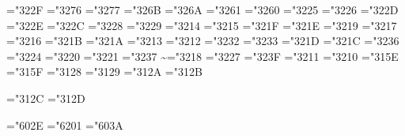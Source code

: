 \mathchardef\propto="322F
\mathchardef\sqsubseteq="3276
\mathchardef\sqsupseteq="3277
\mathchardef\parallel="326B
\mathchardef\mid="326A
\mathchardef\dashv="3261
\mathchardef\vdash="3260
\mathchardef\nearrow="3225
\mathchardef\searrow="3226
\mathchardef\nwarrow="322D
\mathchardef\swarrow="322E
\mathchardef\Leftrightarrow="322C
\mathchardef\Leftarrow="3228
\mathchardef\Rightarrow="3229
\def\neq{\not=} \let\ne=\neq
\mathchardef\leq="3214 \let\le=\leq
\mathchardef\geq="3215 \let\ge=\geq
\mathchardef\succ="321F
\mathchardef\prec="321E
\mathchardef\approx="3219
\mathchardef\succeq="3217
\mathchardef\preceq="3216
\mathchardef\supset="321B
\mathchardef\subset="321A
\mathchardef\supseteq="3213
\mathchardef\subseteq="3212
\mathchardef\in="3232
\mathchardef\ni="3233 \let\owns=\ni
\mathchardef\gg="321D
\mathchardef\ll="321C
\mathchardef\not="3236
\mathchardef\leftrightarrow="3224
\mathchardef\leftarrow="3220 \let\gets=\leftarrow
\mathchardef\rightarrow="3221 \let\to=\rightarrow
\mathchardef\mapstochar="3237 \def\mapsto{\mapstochar\rightarrow}
\mathchardef\sim="3218
\mathchardef\simeq="3227
\mathchardef\perp="323F
\mathchardef\equiv="3211
\mathchardef\asymp="3210
\mathchardef\smile="315E
\mathchardef\frown="315F
\mathchardef\leftharpoonup="3128
\mathchardef\leftharpoondown="3129
\mathchardef\rightharpoonup="312A
\mathchardef\rightharpoondown="312B

\def\joinrel{\mathrel{\mkern-3mu}}
\def\relbar{\mathrel{\smash-}} %
\def\Relbar{\mathrel=}
\mathchardef\lhook="312C \def\hookrightarrow{\lhook\joinrel\rightarrow}
\mathchardef\rhook="312D \def\hookleftarrow{\leftarrow\joinrel\rhook}
\def\bowtie{\mathrel\triangleright\joinrel\mathrel\triangleleft}
\def\models{\mathrel|\joinrel=}
\def\Longrightarrow{\Relbar\joinrel\Rightarrow}

\def\longrightarrow{\protect\@lra}
  \def\@lra{\relbar\joinrel\rightarrow}
\def\longleftarrow{\protect\@lla}
   \def\@lla{\leftarrow\joinrel\relbar}

\def\Longleftarrow{\Leftarrow\joinrel\Relbar}
\def\longmapsto{\mapstochar\longrightarrow}
\def\longleftrightarrow{\leftarrow\joinrel\rightarrow}
\def\Longleftrightarrow{\Leftarrow\joinrel\Rightarrow}
\def\iff{\;\Longleftrightarrow\;}

\mathchardef\ldotp="602E %
\mathchardef\cdotp="6201 %
\mathchardef\colon="603A %

